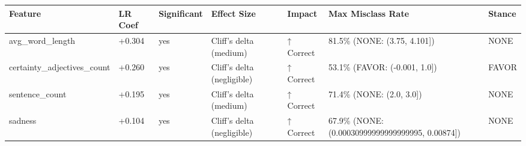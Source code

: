 \begin{tabular}{lllllll}
\toprule
Feature & LR Coef & Significant & Effect Size & Impact & Max Misclass Rate & Stance \\
\midrule
avg\_word\_length & +0.304 & yes & Cliff's delta (medium) & ↑ Correct & 81.5\% (NONE: (3.75, 4.101]) & NONE \\
certainty\_adjectives\_count & +0.260 & yes & Cliff's delta (negligible) & ↑ Correct & 53.1\% (FAVOR: (-0.001, 1.0]) & FAVOR \\
sentence\_count & +0.195 & yes & Cliff's delta (medium) & ↑ Correct & 71.4\% (NONE: (2.0, 3.0]) & NONE \\
sadness & +0.104 & yes & Cliff's delta (negligible) & ↑ Correct & 67.9\% (NONE: (0.00030999999999999995, 0.00874]) & NONE \\
\bottomrule
\end{tabular}
